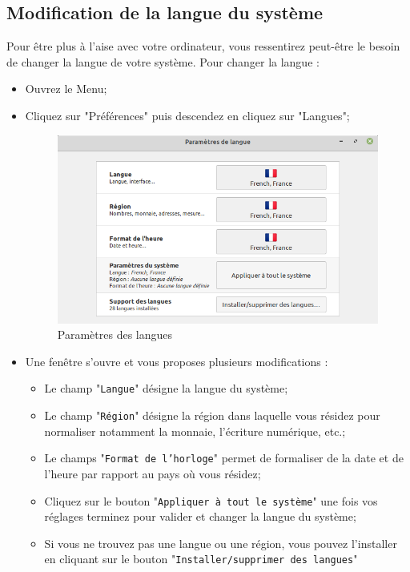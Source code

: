 \documentclass[12pt]{book}
\begin{document}
	\subsection{Modification de la langue du système}
		Pour être plus à l'aise avec votre ordinateur, vous ressentirez peut-être le besoin de changer la langue de votre système.
		Pour changer la langue :
		\begin{itemize}
			\item Ouvrez le Menu;
			\item Cliquez sur "Préférences" puis descendez en cliquez sur "Langues";
			\begin{figure}[h]
				\centering
				\includegraphics[width=.6\textwidth]{include/langues.png}
				\caption{Paramètres des langues}
				\label{fig:langue}
			\end{figure}
			\item Une fenêtre s'ouvre et vous proposes plusieurs modifications :
			\begin{itemize}
				\item Le champ "\texttt{Langue}" désigne la langue du système;
				\item Le champ "\texttt{Région}" désigne la région dans laquelle vous résidez pour normaliser notamment la monnaie, l'écriture numérique, etc.;
				\item Le champs "\texttt{Format de l'horloge}" permet de formaliser de la date et de l'heure par rapport au pays où vous résidez;
				\item Cliquez sur le bouton "\texttt{Appliquer à tout le système}" une fois vos réglages terminez pour valider et changer la langue du système;
				\item Si vous ne trouvez pas une langue ou une région, vous pouvez l'installer en cliquant sur le bouton "\texttt{Installer/supprimer des langues}"
			\end{itemize}
		\end{itemize}
\end{document}
